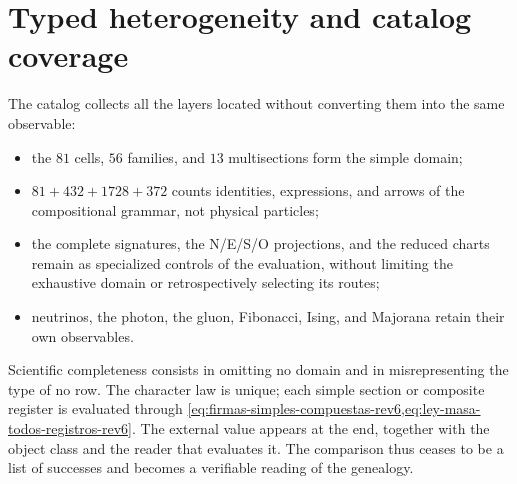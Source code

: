 \section{Typed heterogeneity and catalog coverage}

The catalog collects all the layers located without converting them into the same observable:
\begin{itemize}
\item the \(81\) cells, \(56\) families, and \(13\) multisections form the
simple domain;
\item \(81+432+1728+372\) counts identities, expressions, and arrows of the
compositional grammar, not physical particles;
\item the complete signatures, the N/E/S/O projections, and the reduced charts
      remain as specialized controls of the evaluation, without limiting
      the exhaustive domain or retrospectively selecting its routes;
\item neutrinos, the photon, the gluon, Fibonacci, Ising, and Majorana retain their
own observables.
\end{itemize}

Scientific completeness consists in omitting no domain and in misrepresenting the type of no row. The character law is unique; each simple section or composite register is evaluated through \cref{eq:firmas-simples-compuestas-rev6,eq:ley-masa-todos-registros-rev6}. The external value appears at the end, together with the object class and the reader that evaluates it. The comparison thus ceases to be a list of successes and becomes a verifiable reading of the genealogy.
